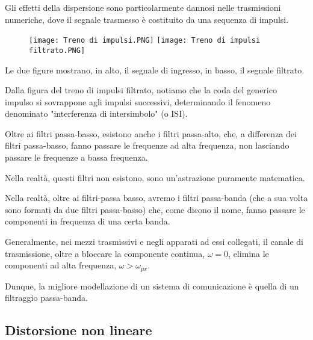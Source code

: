 Gli effetti della dispersione sono particolarmente dannosi nelle trasmissioni numeriche, 
dove il segnale trasmesso è costituito da una sequenza di impulsi. \newline 

{
    \begin{figure}[h]
        \centering
        \texttt{[image: Treno di impulsi.PNG]} 
        \texttt{[image: Treno di impulsi filtrato.PNG]}
    \end{figure}  
     
}

Le due figure mostrano, in alto, il segnale di ingresso, in basso, il segnale filtrato. \newline 

Dalla figura del treno di impulsi filtrato, notiamo che la coda del generico impulso si sovrappone 
agli impulsi successivi, determinando il fenomeno denominato "interferenza di intersimbolo" (o ISI). \newline 

Oltre ai filtri passa-basso, esistono anche i filtri passa-alto, che, a differenza dei filtri passa-basso, 
fanno passare le frequenze ad alta frequenza, non lasciando passare le frequenze a bassa frequenza. \newline 

Nella realtà, questi filtri non esistono, sono un'astrazione puramente matematica. \newline 

Nella realtà, oltre ai filtri-passa basso, avremo i filtri passa-banda (che a sua volta sono formati 
da due filtri passa-basso) che, come dicono il nome, fanno passare le componenti in frequenza di una certa banda. \newline 

Generalmente, nei mezzi trasmissivi e negli apparati ad essi collegati, il canale di trasmissione, oltre 
a bloccare la componente continua, $\omega = 0$, elimina le componenti ad alta frequenza, $\omega > \omega_{px}$. \newline 

Dunque, la migliore modellazione di un sistema di comunicazione è quella di un filtraggio passa-banda. \newline 

\newpage 

\subsection{Distorsione non lineare} 

